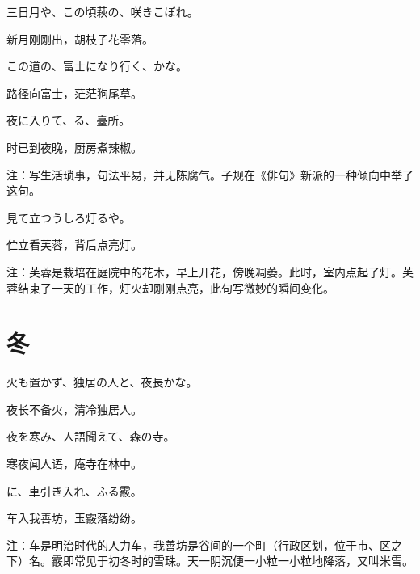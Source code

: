 \begin{haiku}
    {\FH 三日月や、この頃萩の、咲きこぼれ。}

    {\FK 新月刚刚出，胡枝子花零落。}
\end{haiku}

\begin{haiku}
    {\FH この道の、富士になり行く、かな。}

    {\FK 路径向富士，茫茫狗尾草。}
\end{haiku}

\begin{haiku}
    {\FH 夜に入りて、る、臺所。}

    {\FK 时已到夜晚，厨房煮辣椒。}

    {\FT 注：写生活琐事，句法平易，并无陈腐气。子规在《俳句》新派的一种倾向中举了这句。}
\end{haiku}

\begin{haiku}
    {\FH {}見て立つうしろ灯るや。}

    {\FK 伫立看芙蓉，背后点亮灯。}

    {\FT 注：芙蓉是栽培在庭院中的花木，早上开花，傍晚凋萎。此时，室内点起了灯。芙蓉结束了一天的工作，灯火却刚刚点亮，此句写微妙的瞬间变化。}
\end{haiku}

\section{\FK 冬}

\setcounter{haikucounter}{0}

\begin{haiku}
    {\FH 火も置かず、独居の人と、夜長かな。}

    {\FK 夜长不备火，清冷独居人。}
\end{haiku}

\begin{haiku}
    {\FH 夜を寒み、人語聞えて、森の寺。}

    {\FK 寒夜闻人语，庵寺在林中。}
\end{haiku}

\begin{haiku}
    {\FH {}に、車引き入れ、ふる霰。}

    {\FK 车入我善坊，玉霰落纷纷。}

    {\FT 注：车是明治时代的人力车，我善坊是谷间的一个町（行政区划，位于市、区之下）名。霰即常见于初冬时的雪珠。天一阴沉便一小粒一小粒地降落，又叫米雪。}
\end{haiku}

